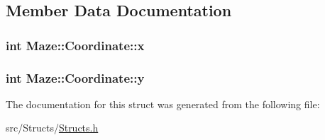 \subsection{Member Data Documentation}
\subsubsection[{\texorpdfstring{x}{x}}]{\setlength{\rightskip}{0pt plus 5cm}int Maze\+::\+Coordinate\+::x}\hypertarget{struct_maze_1_1_coordinate_a41d94fa1b685b7b171288929450a318d}{}\label{struct_maze_1_1_coordinate_a41d94fa1b685b7b171288929450a318d}
\subsubsection[{\texorpdfstring{y}{y}}]{\setlength{\rightskip}{0pt plus 5cm}int Maze\+::\+Coordinate\+::y}\hypertarget{struct_maze_1_1_coordinate_a1a4019e07ffe85fe029fdec65c226e53}{}\label{struct_maze_1_1_coordinate_a1a4019e07ffe85fe029fdec65c226e53}


The documentation for this struct was generated from the following file\+:\begin{DoxyCompactItemize}
\item 
src/\+Structs/\hyperlink{_structs_8h}{Structs.\+h}\end{DoxyCompactItemize}
